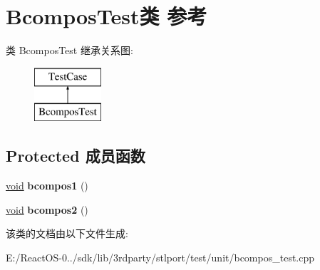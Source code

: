 \hypertarget{class_bcompos_test}{}\section{Bcompos\+Test类 参考}
\label{class_bcompos_test}
类 Bcompos\+Test 继承关系图\+:\begin{figure}[H]
\begin{center}
\leavevmode
\includegraphics[height=2.000000cm]{class_bcompos_test}
\end{center}
\end{figure}
\subsection*{Protected 成员函数}
\begin{DoxyCompactItemize}
\item 
\mbox{\label{class_bcompos_test_a9f05db38f070096ac0d0269bd79775dd}} 
\hyperlink{interfacevoid}{void} {\bfseries bcompos1} ()
\item 
\mbox{\label{class_bcompos_test_aa9ced6bd3317a4ee91b9160960186a65}} 
\hyperlink{interfacevoid}{void} {\bfseries bcompos2} ()
\end{DoxyCompactItemize}


该类的文档由以下文件生成\+:\begin{DoxyCompactItemize}
\item 
E\+:/\+React\+O\+S-\/0../sdk/lib/3rdparty/stlport/test/unit/bcompos\+\_\+test.\+cpp\end{DoxyCompactItemize}
